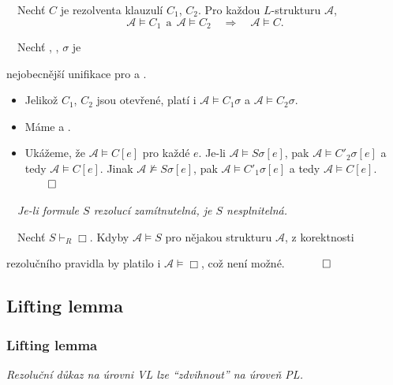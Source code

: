 {\bf {}}\ \ {Nechť $C$ je rezolventa klauzulí $C_1$, $C_2$. Pro každou $L$-strukturu $\mathcal{A}$,}
\vspace{-2mm}
$$\mathcal{A}\models C_1\ \ \text{a}\ \ \mathcal{A}\models C_2\quad \Rightarrow \quad \mathcal{A}\models C.$$

\vspace{-1mm}
{\it {}}\ \ Nechť , , $\sigma$ je
\smallskip

nejobecnější unifikace pro  a .
\smallskip

\begin{itemize}
\item Jelikož $C_1$, $C_2$ jsou otevřené, platí i $\mathcal{A}\models C_1\sigma$ a $\mathcal{A}\models C_2\sigma$.
\smallskip

\item Máme  a .
\smallskip

\item Ukážeme, že $\mathcal{A}\models C[e]$ pro každé $e$.
\smallskip
Je-li $\mathcal{A}\models S\sigma[e]$, pak $\mathcal{A}\models C'_2\sigma[e]$ a tedy $\mathcal{A}\models C[e]$.
\smallskip
Jinak $\mathcal{A}\not\models S\sigma[e]$, pak $\mathcal{A}\models C'_1\sigma[e]$ a tedy $\mathcal{A}\models C[e]$. $\qed$
\end{itemize}
\medskip

{\bf {}}\ \ {\it Je-li formule $S$ rezolucí zamítnutelná, je $S$ nesplnitelná.}
\medskip

{\it {}}\ \ Nechť $S \vdash_R \Box$. Kdyby $\mathcal{A}\models S$ pro nějakou strukturu $\mathcal{A}$, z korektnosti
\smallskip

rezolučního pravidla by platilo i $\mathcal{A} \models \Box$, což není možné. $\quad\qed$

\subsection{Lifting lemma}\todo

\subsubsection*{Lifting lemma}
    {\it Rezoluční důkaz na úrovni VL lze ``zdvihnout'' na úroveň PL.}
    \medskip
    
